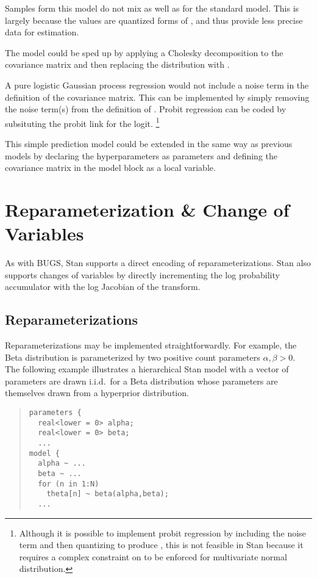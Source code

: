 Samples form this model do not mix as well as for the standard model.
This is largely because the  values are quantized forms of
, and thus provide less precise data for estimation.  

The model could be sped up by applying a Cholesky decomposition to the
covariance matrix  and then replacing the
 distribution with .

A pure logistic Gaussian process regression would not include a noise
term in the definition of the covariance matrix.  This can be
implemented by simply removing the noise term(s)  from
the definition of .  Probit regression can be coded by
subsituting the probit link for the logit.%
%
\footnote{Although it is possible to implement probit regression by
  including the noise term  and then quantizing
   to produce , this is not feasible in Stan
  because it requires a complex constraint on  to be enforced
  for multivariate normal distribution.}

This simple prediction model could be extended in the same way as
previous models by declaring the hyperparameters as parameters and
defining the covariance matrix in the model block as a local variable.





\chapter{Reparameterization \& Change of Variables}\label{change-of-variables.chapter}

\noindent
As with BUGS, Stan supports a direct encoding of reparameterizations.
Stan also supports changes of variables by directly incrementing the
log probability accumulator with the log Jacobian of the transform.

\section{Reparameterizations}

Reparameterizations may be implemented straightforwardly.  For
example, the Beta distribution is parameterized by two positive count
parameters $\alpha, \beta > 0$.  The following example illustrates a
hierarchical Stan model with a vector of parameters  are
drawn i.i.d.\ for a Beta distribution whose parameters are themselves
drawn from a hyperprior distribution.
%
\begin{quote}
\begin{Verbatim}[fontsize=\small]
parameters {
  real<lower = 0> alpha;
  real<lower = 0> beta;
  ...
model {
  alpha ~ ...
  beta ~ ...
  for (n in 1:N)
    theta[n] ~ beta(alpha,beta);
  ...
\end{Verbatim}
\end{quote}

